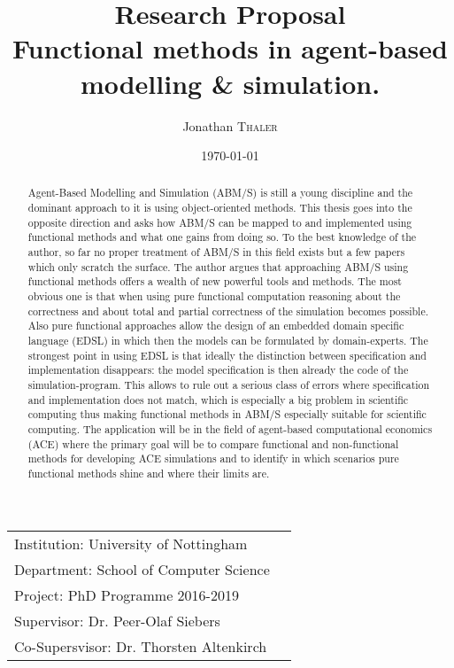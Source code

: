 \documentclass{article}
\title{ {\normalsize Research Proposal} \\ Functional methods in agent-based modelling \& simulation.} %
\author{Jonathan \textsc{Thaler}} %
\date{\today} %
\begin{document}
\maketitle %

\begin{center}
\begin{tabular}{l r}
Institution: University of Nottingham \\
Department: School of Computer Science \\
Project: PhD Programme 2016-2019 \\
Supervisor: Dr. Peer-Olaf Siebers \\
Co-Supersvisor: Dr. Thorsten Altenkirch 
\end{tabular}
\end{center}

\begin{abstract}
Agent-Based Modelling and Simulation (ABM/S) is still a young discipline and the dominant approach to it is using object-oriented methods. This thesis goes into the opposite direction and asks how ABM/S can be mapped to and implemented using functional methods and what one gains from doing so. To the best knowledge of the author, so far no proper treatment of ABM/S in this field exists but a few papers which only scratch the surface. The author argues that approaching ABM/S using functional methods offers a wealth of new powerful tools and methods. The most obvious one is that when using pure functional computation reasoning about the correctness and about total and partial correctness of the simulation becomes possible. Also pure functional approaches allow the design of an embedded domain specific language (EDSL) in which then the models can be formulated by domain-experts. The strongest point in using EDSL is that ideally the distinction between specification and implementation disappears: the model specification is then already the code of the simulation-program. This allows to rule out a serious class of errors where specification and implementation does not match, which is especially a big problem in scientific computing thus making functional methods in ABM/S especially suitable for scientific computing. The application will be in the field of agent-based computational economics (ACE) where the primary goal will be to compare functional and non-functional methods for developing ACE simulations and to identify in which scenarios pure functional methods shine and where their limits are.
\end{abstract}
\end{document}

